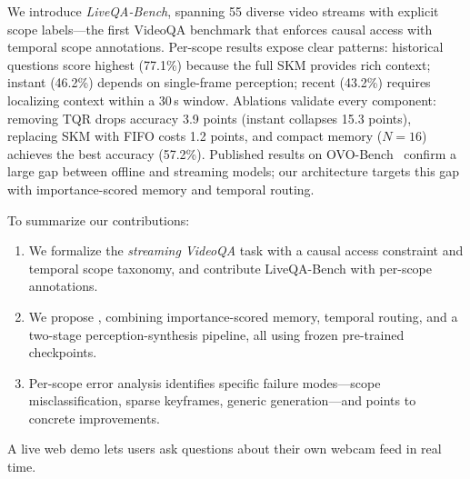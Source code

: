 We introduce \emph{LiveQA-Bench}, spanning 55 diverse video streams with explicit scope labels---the first VideoQA benchmark that enforces causal access with temporal scope annotations.
Per-scope results expose clear patterns: historical questions score highest (77.1\%) because the full SKM provides rich context; instant (46.2\%) depends on single-frame perception; recent (43.2\%) requires localizing context within a 30\,s window.
Ablations validate every component: removing TQR drops accuracy 3.9 points (instant collapses 15.3 points), replacing SKM with FIFO costs 1.2 points, and compact memory ($N\!=\!16$) achieves the best accuracy (57.2\%).
Published results on OVO-Bench~\cite{li2025ovobench} confirm a large gap between offline and streaming models; our architecture targets this gap with importance-scored memory and temporal routing.

To summarize our contributions:
\begin{enumerate}[leftmargin=*,itemsep=1pt]
  \item We formalize the \emph{streaming VideoQA} task with a causal access constraint and temporal scope taxonomy, and contribute LiveQA-Bench with per-scope annotations.
  \item We propose \ours, combining importance-scored memory, temporal routing, and a two-stage perception-synthesis pipeline, all using frozen pre-trained checkpoints.
  \item Per-scope error analysis identifies specific failure modes---scope misclassification, sparse keyframes, generic generation---and points to concrete improvements.
\end{enumerate}

A live web demo lets users ask questions about their own webcam feed in real time.
